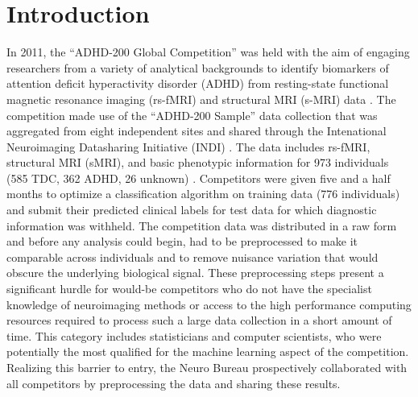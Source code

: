 \documentclass[preprint,12pt,3p]{elsarticle}
\begin{document}
\section{Introduction}

In 2011, the ``ADHD-200 Global Competition'' was held with the aim of engaging researchers from a variety of analytical backgrounds to identify biomarkers of attention deficit hyperactivity disorder (ADHD) from resting-state functional magnetic resonance imaging (rs-fMRI) and structural MRI (s-MRI) data \cite{Milham2012}. The competition made use of the ``ADHD-200 Sample'' data collection that was aggregated from eight independent sites and shared through the Intenational Neuroimaging Datasharing Initiative (INDI) \cite{Mennes2013}. The data includes rs-fMRI, structural MRI (sMRI), and basic phenotypic information for 973 individuals (585 TDC, 362 ADHD, 26 unknown) \cite{Milham2012}. Competitors were given five and a half months to optimize a classification algorithm on training data (776 individuals) and submit their predicted clinical labels for test data for which diagnostic information was withheld. The competition data was distributed in a raw form and before any analysis could begin, had to be preprocessed to make it comparable across individuals and to remove nuisance variation that would obscure the underlying biological signal. These preprocessing steps present a significant hurdle for would-be competitors who do not have the specialist knowledge of neuroimaging methods or access to the high performance computing resources required to process such a large data collection in a short amount of time. This category includes statisticians and computer scientists, who were potentially the most qualified for the machine learning aspect of the competition. Realizing this barrier to entry, the Neuro Bureau prospectively collaborated with all competitors by preprocessing the data and sharing these results.
\end{document}
